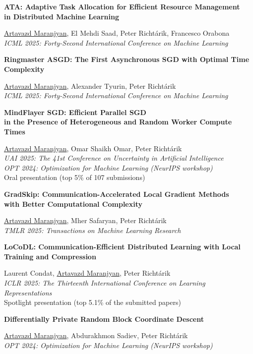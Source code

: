 \documentclass[10pt,a4paper,sans]{moderncv}        %
\newcommand{\red}{\color{cherry}}
\newcommand{\highlight}[1]{{\red #1}}
\begin{document}
{\parbox[t]{\linewidth}{\textbf{%
  ATA: Adaptive Task Allocation for Efficient Resource Management \\ in Distributed Machine Learning
  }}}
{}{}{}
{
  \normalsize \underline{Artavazd Maranjyan}, El Mehdi Saad, Peter Richtárik, Francesco Orabona \\
  \textit{ICML 2025: Forty-Second International Conference on Machine Learning}
}

{\parbox[t]{\linewidth}{\textbf{%
  Ringmaster ASGD: The First Asynchronous SGD with Optimal Time Complexity
  }}}
{}{}{}
{
  \normalsize \underline{Artavazd Maranjyan}, Alexander Tyurin, Peter Richtárik \\
  \textit{ICML 2025: Forty-Second International Conference on Machine Learning}
}

{\parbox[t]{\linewidth}{\textbf{%
  MindFlayer SGD: Efficient Parallel SGD \\ in the Presence of Heterogeneous and Random Worker Compute Times
  }}}
{}{}{}
{
  \normalsize
  \underline{Artavazd Maranjyan}, Omar Shaikh Omar, Peter Richtárik \\
  \textit{UAI 2025: The 41st Conference on Uncertainty in Artificial Intelligence}\\
  \textit{OPT 2024: Optimization for Machine Learning (NeurIPS workshop)}\\
  \highlight{Oral presentation (top 5\% of 107 submissions)}
}

{\parbox[t]{\linewidth}{\textbf{%
  GradSkip: Communication-Accelerated Local Gradient Methods \\ with Better Computational Complexity
  }}}
{}{}{}
{
  \normalsize
  \underline{Artavazd Maranjyan}, Mher Safaryan, Peter Richtárik \\
  \textit{TMLR 2025: Transactions on Machine Learning Research}
}

{\parbox[t]{\linewidth}{\textbf{%
  LoCoDL: Communication-Efficient Distributed Learning with Local Training and Compression
  }}}
{}{}{}
{
  \normalsize
  Laurent Condat, \underline{Artavazd Maranjyan}, Peter Richtárik \\
  \textit{ICLR 2025: The Thirteenth International Conference on Learning Representations}\\
  \highlight{Spotlight presentation (top 5.1\% of the submitted papers)}
}

{\parbox[t]{\linewidth}{\textbf{%
  Differentially Private Random Block Coordinate Descent
  }}}
{}{}{}
{
  \normalsize
  \underline{Artavazd Maranjyan}, Abdurakhmon Sadiev, Peter Richtárik\\
  \textit{OPT 2024: Optimization for Machine Learning (NeurIPS workshop)}
}
\end{document}
